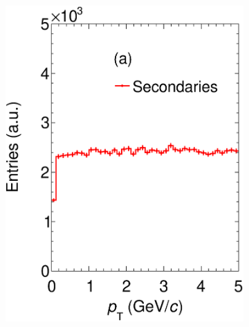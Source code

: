 \begin{figure}[!ht]
     \centering
     \begin{subfigure}[b]{0.32\textwidth}
         \centering
         \includegraphics[width=\textwidth]{figures/ch5-KF_NDGAr/ToySample/testNDGArMirrorpTAllTall.eps}
         \caption{}
         \label{fig:ptGAr}
     \end{subfigure}
     \begin{subfigure}[b]{0.32\textwidth}
         \centering

\end{subfigure}
\end{figure}
